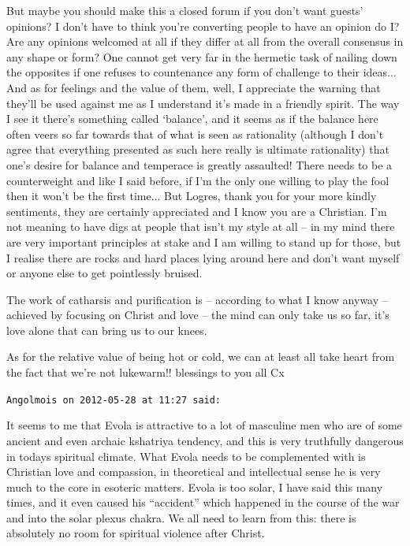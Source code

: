 \begin{footnotesize}
\begin{sffamily}
But maybe you should make this a closed forum if you don't want guests' opinions? I don't have to think you're converting people to have an opinion do I? Are any opinions welcomed at all if they differ at all from the overall consensus in any shape or form? One cannot get very far in the hermetic task of nailing down the opposites if one refuses to countenance any form of challenge to their ideas... And as for feelings and the value of them, well, I appreciate the warning that they'll be used against me as I understand it's made in a friendly spirit. The way I see it there's something called `balance', and it seems as if the balance here often veers so far towards that of what is seen as rationality (although I don't agree that everything presented as such here really is ultimate rationality) that one's desire for balance and temperace is greatly assaulted! There needs to be a counterweight and like I said before, if I'm the only one willing to play the fool then it won't be the first time... But Logres, thank you for your more kindly sentiments, they are certainly appreciated and I know you are a Christian. I'm not meaning to have digs at people that isn't my style at all -- in my mind there are very important principles at stake and I am willing to stand up for those, but I realise there are rocks and hard places lying around here and don't want myself or anyone else to get pointlessly bruised.

The work of catharsis and purification is -- according to what I know anyway -- achieved by focusing on Christ and love -- the mind can only take us so far, it's love alone that can bring us to our knees.

As for the relative value of being hot or cold, we can at least all take heart from the fact that we're not lukewarm!! blessings to you all Cx

\hfill

\texttt{Angolmois on 2012-05-28 at 11:27 said:}

It seems to me that Evola is attractive to a lot of masculine men who are of some ancient and even archaic kshatriya tendency, and this is very truthfully dangerous in todays spiritual climate. What Evola needs to be complemented with is Christian love and compassion, in theoretical and intellectual sense he is very much to the core in esoteric matters. Evola is too solar, I have said this many times, and it even caused his ``accident'' which happened in the course of the war and into the solar plexus chakra. We all need to learn from this: there is absolutely no room for spiritual violence after Christ.


\end{sffamily}
\end{footnotesize}
